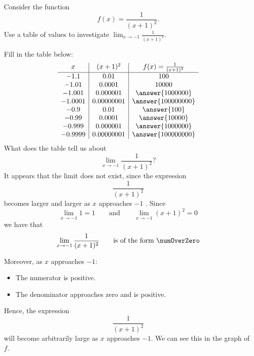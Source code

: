 \documentclass{ximera}
\begin{document}
\begin{example}
Consider the function
  \[
  f(x) = \frac{1}{(x+1)^2}.
  \]
  Use a table of values to investigate $\lim_{x\to -1} \frac{1}{(x+1)^2}$.
  \begin{explanation}
    Fill in the table below:
    \[
    \begin{array}{c|c|c}
      x & (x+1)^{2} & f(x) = \frac{1}{(x+1)^2}\\ \hline
      -1.1    & 0.01       & 100 \\
      -1.01   & 0.0001     & 10000 \\
      -1.001  & 0.000001   & \answer{1000000} \\
      -1.0001 & 0.00000001 & \answer{100000000} \\
      -0.9    & 0.01       & \answer{100} \\
      -0.99   & 0.0001     & \answer{10000} \\
      -0.999  & 0.000001   & \answer{1000000} \\
      -0.9999 & 0.00000001 & \answer{100000000} \\
    \end{array}
    \]
    What does the table tell us about 
    \[
    \lim_{x\to -1} \frac{1}{(x+1)^2}?
    \]
    It appears that the limit  does not exist, since the expression
    \[
    \frac{1}{(x+1)^2}
    \]
    becomes larger and larger as  $x$ approaches $-1$ . 
        Since
    \[
    \lim_{x\to -1} 1 = 1 \qquad\text{and}\qquad \lim_{x\to -1}(x+1)^2 = 0
    \]
	we have that
    \[
    \lim_{x\to -1} \frac{1}{(x+1)^2}\qquad\text{is of the form }\numOverZero
    \]

    Moreover, as $x$ approaches $-1$:
    \begin{itemize}
    \item The numerator is positive.
    \item The denominator approaches zero and is positive.
    \end{itemize}
    Hence, the expression
    \[
    \frac{1}{(x+1)^2}
    \]
    will become arbitrarily large as $x$ approaches $-1$.  We can see this
    in the graph of $f$.
    \begin{image}
    \end{image}
  \end{explanation}
\end{example}
\end{document}

